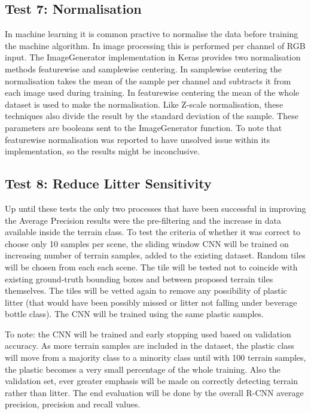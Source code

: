 \documentclass{IEEEtran}
\begin{document}
\subsection{Test 7: Normalisation}

In machine learning it is common practive to normalise the data before training the machine algorithm. In image processing this is performed per channel of RGB input. The ImageGenerator implementation in Keras provides two normalisation methods featurewise and samplewise centering. In samplewise centering the normalisation takes the mean of the sample per channel and subtracts it from each image used during training. In featurewise centering the mean of the whole dataset is used to make the normalisation. Like Z-scale normalisation, these techniques also divide the result by the standard deviation of the sample. These parameters are booleans sent to the ImageGenerator function. To note that featurewise normalisation was reported to have unsolved issue within its implementation, so the results might be inconclusive.\newline


\subsection{Test 8: Reduce Litter Sensitivity}

Up until these tests the only two processes that have been successful in improving the Average Precision results were the pre-filtering and the increase in data available inside the terrain class. To test the criteria of whether it was correct to choose only 10 samples per scene, the sliding window CNN will be trained on increasing number of terrain samples, added to the existing dataset. Random tiles will be chosen from each each scene. The tile will be tested not to coincide with existing ground-truth bounding boxes and between proposed terrain tiles themselves. The tiles will be vetted again to remove any possibility of plastic litter (that would have been possibly missed or litter not falling under beverage bottle class). The CNN will be trained using the same 
plastic samples.

To note: the CNN will be trained and early stopping used based on validation accuracy. As more terrain samples are included in the dataset, the plastic class will move from a majority class to a minority class until with 100 terrain samples, the plastic becomes a very small percentage of the whole training. Also the validation set, ever greater emphasis will be made on correctly detecting terrain rather than litter. The end evaluation will be done by the overall R-CNN average precision, precision and recall values. 
\end{document}
